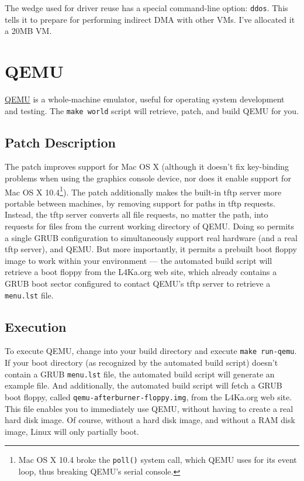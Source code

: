 \documentclass[10pt,a4paper]{article}
\newcommand{\code}[1]{\texttt{#1}}
\newcommand{\cmd}[1]{\texttt{#1}}
\newcommand{\dir}[1]{\texttt{#1}}
\begin{document}
The wedge used for driver reuse has a special command-line option: \code{ddos}.
This tells it to prepare for performing indirect DMA with other VMs.  I've
allocated it a 20MB VM.


\section{QEMU}

\href{http://fabrice.bellard.free.fr/qemu/user-doc.html}{QEMU} is a
whole-machine emulator, useful for operating system development and
testing.  The \cmd{make world} script will retrieve, patch, and build
QEMU for you.  

\subsection{Patch Description}

The patch improves support for Mac OS X (although it doesn't fix
key-binding problems when using the graphics console device, nor does
it enable support for Mac OS X 10.4\footnote{Mac OS X 10.4 broke the
\code{poll()} system call, which QEMU uses for its event loop, thus
breaking QEMU's serial console.}).  The patch additionally makes the
built-in tftp server more portable between machines, by removing
support for paths in tftp requests.  Instead, the tftp server converts
all file requests, no matter the path, into requests for files from
the current working directory of QEMU.  Doing so permits a single GRUB
configuration to simultaneously support real hardware (and a real tftp
server), and QEMU.  But more importantly, it permits a prebuilt boot
floppy image to work within your environment --- the automated build
script will retrieve a boot floppy from the L4Ka.org web site, which
already contains a GRUB boot sector configured to contact QEMU's tftp
server to retrieve a \dir{menu.lst} file.

\subsection{Execution}

To execute QEMU, change into your build directory and execute
\cmd{make run-qemu}.  If your boot directory (as recognized by the
automated build script) doesn't contain a GRUB \dir{menu.lst} file,
the automated build script will generate an example file.  And
additionally, the automated build script will fetch a GRUB boot
floppy, called \dir{qemu-afterburner-floppy.img}, from the L4Ka.org
web site.  This file enables you to immediately use QEMU, without
having to create a real hard disk image.  Of course, without a hard
disk image, and without a RAM disk image, Linux will only partially
boot.
\end{document}
